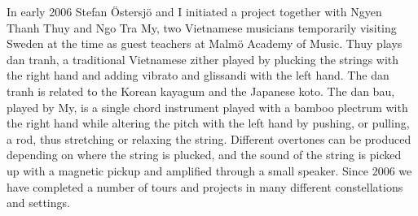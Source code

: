 \documentclass[a4paper]{article}
\begin{document}
In early 2006 Stefan Östersjö and I initiated a project together with Ngyen Thanh Thuy and Ngo Tra My, two Vietnamese musicians temporarily visiting Sweden at the time as guest teachers at Malmö Academy of Music. Thuy plays dan tranh, a traditional Vietnamese zither played by plucking the strings with the right hand and adding vibrato and glissandi with the left hand. The dan tranh is related to the Korean kayagum and the Japanese koto. The dan bau, played by My, is a single chord instrument played with a bamboo plectrum with the right hand while altering the pitch with the left hand by pushing, or pulling, a rod, thus stretching or relaxing the string. Different overtones can be produced depending on where the string is plucked, and the sound of the string is picked up with a magnetic pickup and amplified through a small speaker. Since 2006 we have completed a number of tours and projects in many different constellations and settings.

\end{document}

